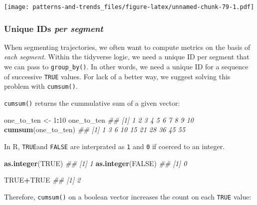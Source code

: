 \documentclass[]{book}
\newenvironment{Shaded}{\begin{snugshade}}{\end{snugshade}}
\newcommand{\CommentTok}[1]{\textcolor[rgb]{0.56,0.35,0.01}{\textit{#1}}}
\newcommand{\DecValTok}[1]{\textcolor[rgb]{0.00,0.00,0.81}{#1}}
\newcommand{\KeywordTok}[1]{\textcolor[rgb]{0.13,0.29,0.53}{\textbf{#1}}}
\newcommand{\NormalTok}[1]{#1}
\newcommand{\OperatorTok}[1]{\textcolor[rgb]{0.81,0.36,0.00}{\textbf{#1}}}
\newcommand{\OtherTok}[1]{\textcolor[rgb]{0.56,0.35,0.01}{#1}}
\newcommand{\StringTok}[1]{\textcolor[rgb]{0.31,0.60,0.02}{#1}}
\begin{document}
\texttt{[image: patterns-and-trends\_files/figure-latex/unnamed-chunk-79-1.pdf]}

\hypertarget{unique-ids-per-segment}{%
\subsubsection{\texorpdfstring{Unique IDs \emph{per segment}}{Unique IDs per segment}}\label{unique-ids-per-segment}}

When segmenting trajectories, we often want to compute metrics on the basis of \emph{each segment}. Within the tidyverse logic, we need a unique ID per segment that we can pass to \texttt{group\_by()}. In other words, we need a unique ID for a sequence of successive \texttt{TRUE} values. For lack of a better way, we suggest solving this problem with \texttt{cumsum()}.

\texttt{cumsum()} returns the cummulative sum of a given vector:

\begin{Shaded}
\begin{Highlighting}[]
\NormalTok{one_to_ten <-}\StringTok{ }\DecValTok{1}\OperatorTok{:}\DecValTok{10}
\NormalTok{one_to_ten}
\CommentTok{##  [1]  1  2  3  4  5  6  7  8  9 10}
\KeywordTok{cumsum}\NormalTok{(one_to_ten)}
\CommentTok{##  [1]  1  3  6 10 15 21 28 36 45 55}
\end{Highlighting}
\end{Shaded}

In R, \texttt{TRUE}and \texttt{FALSE} are interprated as \texttt{1} and \texttt{0} if coerced to an integer.

\begin{Shaded}
\begin{Highlighting}[]
\KeywordTok{as.integer}\NormalTok{(}\OtherTok{TRUE}\NormalTok{)}
\CommentTok{## [1] 1}
\KeywordTok{as.integer}\NormalTok{(}\OtherTok{FALSE}\NormalTok{)}
\CommentTok{## [1] 0}

\OtherTok{TRUE}\OperatorTok{+}\OtherTok{TRUE}
\CommentTok{## [1] 2}
\end{Highlighting}
\end{Shaded}

Therefore, \texttt{cumsum()} on a boolean vector increases the count on each \texttt{TRUE} value:
\end{document}
